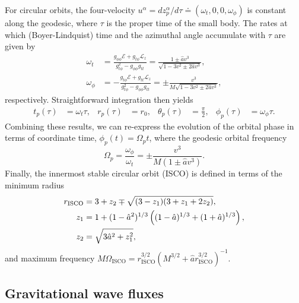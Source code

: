 \documentclass[%
 reprint,
 nofootinbib,
 amsmath,amssymb,
 aps,
 prd,
]{revtex4-2}
\begin{document}
For circular orbits, the four-velocity $u^\alpha = dz_p^\alpha/d\tau \doteq (\omega_t, 0, 0, \omega_\phi)$ is constant along the geodesic, where $\tau$ is the proper time of the small body. The rates at which (Boyer-Lindquist) time and the azimuthal angle accumulate with $\tau$ are given by
\begin{subequations}
\begin{align}
    \omega_t &= \frac{g_{\phi\phi} \mathcal{E} + g_{t\phi}\mathcal{L}_z}{g_{t\phi}^2-g_{\phi\phi}g_{tt}} = \frac{1 \pm \hat{a} v^3}{\sqrt{1 - 3 v^2 \pm 2 \hat{a} v^3}},
    \\
    \omega_\phi &= -\frac{g_{t\phi} \mathcal{E} + g_{tt}\mathcal{L}_z}{g_{t\phi}^2-g_{\phi\phi}g_{tt}} = \pm \frac{v^3}{M\sqrt{1 - 3 v^2 \pm 2 \hat{a} v^3}},
\end{align}
\end{subequations}
respectively. Straightforward integration then yields
\begin{align*}
    t_p(\tau) &= \omega_t \tau,
    &
    r_p(\tau) &= r_0,
    &
    \theta_p(\tau) &= \frac{\pi}{2},
    &
    \phi_p(\tau) &= \omega_\phi\tau.
\end{align*}
Combining these results, we can re-express the evolution of the orbital phase in terms of coordinate time, $\phi_p(t) = \Omega_p t$, where the geodesic orbital frequency
\begin{equation} \label{eqn:OmegaOfR}
    \Omega_p = \frac{\omega_\phi}{\omega_t}
    = \pm \frac{v^3}{M(1 \pm \hat{a} v^3)}.
\end{equation}
Finally, the innermost stable circular orbit (ISCO) is defined in terms of the minimum radius
\begin{align}
    r_\mathrm{ISCO} &= 3 + z_2 \mp
    \sqrt{(3 - z_1)(3 + z_1 + 2z_2)},
    \\ \notag
    z_1 & = 1 + (1 - \hat{a}^2)^{1/3}
    \left((1-\hat{a})^{1/3} + (1 + \hat{a})^{1/3} \right),
    \\ \notag
    z_2 &= \sqrt{3 \hat{a}^2 + z_1^2},
\end{align}
and maximum frequency $M\Omega_\mathrm{ISCO} = r_\mathrm{ISCO}^{3/2}(M^{3/2} + \hat{a} r_\mathrm{ISCO}^{3/2})^{-1}$.

\subsection{Gravitational wave fluxes}
\label{sec:fluxes}
\end{document}

